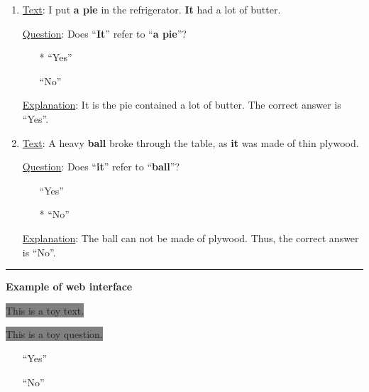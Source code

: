 \documentclass[11pt]{article}
\makeatletter
\newcommand*{\radiobutton}{\@ifstar{\@radiobutton0}{\@radiobutton1}}
\newcommand*{\@radiobutton}[1]{\begin{tikzpicture}
    \pgfmathsetlengthmacro\radius{height("X")/3}
    \draw[radius=\radius] circle;
    \ifcase#1 \fill[radius=.6*\radius] circle;\fi
  \end{tikzpicture}}
\makeatother
\begin{document}
\begin{table*}[pt!]
\begin{minipage}[t]{.43\linewidth}
\begin{enumerate}[topsep=0.1pt,noitemsep]
    \item \underline{Text}:  I put \textbf{a pie} in the refrigerator. \textbf{It} had a lot of butter.

    \noindent \underline{Question}: Does ``\textbf{It}'' refer to ``\textbf{a pie}''?
    
    \begin{itemize}[topsep=0.1pt,noitemsep]
        \item[\radiobutton*] ``Yes''
        \item[\radiobutton] ``No''
    \end{itemize}
    
    \noindent \underline{Explanation}: It is the pie contained a lot of butter. The correct answer is ``Yes''.
    
    \item \underline{Text}: A heavy \textbf{ball} broke through the table, as \textbf{it} was made of thin plywood.
    
    \noindent \underline{Question}: Does ``\textbf{it}'' refer to ``\textbf{ball}''?
    
    \begin{itemize}[topsep=0.1pt,noitemsep]
        \item[\radiobutton] ``Yes''
        \item[\radiobutton*] ``No''
    \end{itemize}
    
    \noindent \underline{Explanation}: The ball can not be made of plywood. Thus, the correct answer is ``No''.
    
\end{enumerate}

\par\noindent\rule{\textwidth}{0.8pt}

\vspace{0.05cm}
\textbf{Example of web interface}
\vspace{0.1cm}

\colorbox{Gray}{This is a toy text.}

\colorbox{Gray}{This is a toy question.}

\begin{itemize}[topsep=0.1pt,noitemsep]
    \item[\radiobutton] ``Yes''
    \item[\radiobutton] ``No''
\end{itemize}


\end{minipage}
\end{table*}
\end{document}
